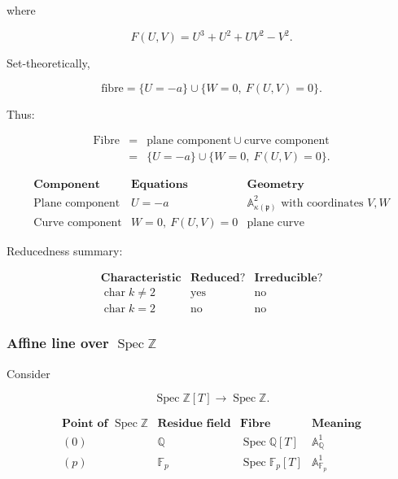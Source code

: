 \documentclass[12pt,a4paper]{article}
\theoremstyle{notespace}
\begin{document}
where

\[
F(U,V)=U^3+U^2+UV^2-V^2.
\]

Set-theoretically,

\[
\text{fibre}
=
\{U=-a\}
\cup
\{W=0,\ F(U,V)=0\}.
\]

Thus:

\[
\begin{array}{ccc}
	\text{Fibre}
	&
	=
	&
	\text{plane component}\ \cup\ \text{curve component}
	\\[0.5em]
	&
	=
	&
	\{U=-a\}\cup \{W=0,\ F(U,V)=0\}.
\end{array}
\]

\[
\begin{array}{c|c|c}
	\textbf{Component} & \textbf{Equations} & \textbf{Geometry} \\
	\hline
	\text{Plane component}
	&
	U=-a
	&
	\mathbb{A}^2_{\kappa(\mathfrak{p})}\text{ with coordinates }V,W
	\\
	\hline
	\text{Curve component}
	&
	W=0,\ F(U,V)=0
	&
	\text{plane curve}
\end{array}
\]

Reducedness summary:

\[
\begin{array}{c|c|c}
	\textbf{Characteristic} & \textbf{Reduced?} & \textbf{Irreducible?} \\
	\hline
	\operatorname{char}k\neq 2
	&
	\text{yes}
	&
	\text{no}
	\\
	\hline
	\operatorname{char}k=2
	&
	\text{no}
	&
	\text{no}
\end{array}
\]

\subsubsection{Affine line over \texorpdfstring{\(\operatorname{Spec}\mathbb{Z}\)}{Spec Z}}

Consider

\[
\operatorname{Spec}\mathbb{Z}[T]\to \operatorname{Spec}\mathbb{Z}.
\]

\[
\begin{array}{c|c|c|c}
	\textbf{Point of }\operatorname{Spec}\mathbb{Z}
	&
	\textbf{Residue field}
	&
	\textbf{Fibre}
	&
	\textbf{Meaning}
	\\
	\hline
	(0)
	&
	\mathbb{Q}
	&
	\operatorname{Spec}\mathbb{Q}[T]
	&
	\mathbb{A}^1_{\mathbb{Q}}
	\\
	\hline
	(p)
	&
	\mathbb{F}_p
	&
	\operatorname{Spec}\mathbb{F}_p[T]
	&
	\mathbb{A}^1_{\mathbb{F}_p}
\end{array}
\]
\end{document}
